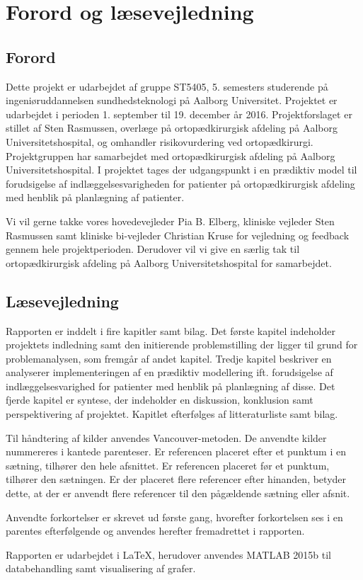 \chapter*{Forord og læsevejledning}

\section*{Forord}
Dette projekt er udarbejdet af gruppe ST5405, 5. semesters studerende på ingeniøruddannelsen sundhedsteknologi på Aalborg Universitet. Projektet er udarbejdet i perioden 1. september til 19. december år 2016. Projektforslaget er stillet af Sten Rasmussen, overlæge på ortopædkirurgisk afdeling på Aalborg Universitetshospital, og omhandler risikovurdering ved ortopædkirurgi. Projektgruppen har samarbejdet med ortopædkirurgisk afdeling på Aalborg Universitetshospital. I projektet tages der udgangspunkt i en prædiktiv model til forudsigelse af indlæggelsesvarigheden for patienter på ortopædkirurgisk afdeling med henblik på planlægning af patienter. 


Vi vil gerne takke vores hovedevejleder Pia B. Elberg, kliniske vejleder Sten Rasmussen samt kliniske bi-vejleder Christian Kruse for vejledning og feedback gennem hele projektperioden. Derudover vil vi give en særlig tak til ortopædkirurgisk afdeling på Aalborg Universitetshospital for samarbejdet. 


\section*{Læsevejledning}
Rapporten er inddelt i fire kapitler samt bilag. Det første kapitel indeholder projektets indledning samt den initierende problemstilling der ligger til grund for problemanalysen, som fremgår af andet kapitel. Tredje kapitel beskriver en analyserer implementeringen af en prædiktiv modellering ift. forudsigelse af indlæggelsesvarighed for patienter med henblik på planlægning af disse. Det fjerde kapitel er syntese, der indeholder en diskussion, konklusion samt perspektivering af projektet. Kapitlet efterfølges af litteraturliste samt bilag. 


Til håndtering af kilder anvendes Vancouver-metoden. De anvendte kilder nummereres i kantede parenteser. Er referencen placeret efter et punktum i en sætning, tilhører den hele afsnittet. Er referencen placeret før et punktum, tilhører den sætningen. Er der placeret flere referencer efter hinanden, betyder dette, at der er anvendt flere referencer til den pågældende sætning eller afsnit.

Anvendte forkortelser er skrevet ud første gang, hvorefter forkortelsen ses i en parentes efterfølgende og anvendes herefter fremadrettet i rapporten. 


Rapporten er udarbejdet i \LaTeX, herudover anvendes MATLAB 2015b til databehandling samt visualisering af grafer. 
